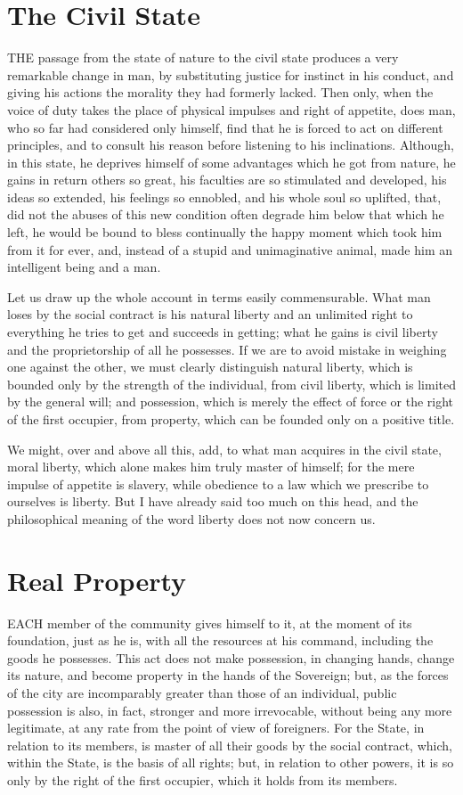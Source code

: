 \documentclass[12pt]{book}
\begin{document}
\section{The Civil State}
THE passage from the state of nature to the civil state produces a very remarkable change in man, by substituting justice for instinct in his conduct, and giving his actions the morality they had formerly lacked. Then only, when the voice of duty takes the place of physical impulses and right of appetite, does man, who so far had considered only himself, find that he is forced to act on different principles, and to consult his reason before listening to his inclinations. Although, in this state, he deprives himself of some advantages which he got from nature, he gains in return others so great, his faculties are so stimulated and developed, his ideas so extended, his feelings so ennobled, and his whole soul so uplifted, that, did not the abuses of this new condition often degrade him below that which he left, he would be bound to bless continually the happy moment which took him from it for ever, and, instead of a stupid and unimaginative animal, made him an intelligent being and a man.

Let us draw up the whole account in terms easily commensurable. What man loses by the social contract is his natural liberty and an unlimited right to everything he tries to get and succeeds in getting; what he gains is civil liberty and the proprietorship of all he possesses. If we are to avoid mistake in weighing one against the other, we must clearly distinguish natural liberty, which is bounded only by the strength of the individual, from civil liberty, which is limited by the general will; and possession, which is merely the effect of force or the right of the first occupier, from property, which can be founded only on a positive title.

We might, over and above all this, add, to what man acquires in the civil state, moral liberty, which alone makes him truly master of himself; for the mere impulse of appetite is slavery, while obedience to a law which we prescribe to ourselves is liberty. But I have already said too much on this head, and the philosophical meaning of the word liberty does not now concern us.
\clearpage
\section{Real Property}
EACH member of the community gives himself to it, at the moment of its foundation, just as he is, with all the resources at his command, including the goods he possesses. This act does not make possession, in changing hands, change its nature, and become property in the hands of the Sovereign; but, as the forces of the city are incomparably greater than those of an individual, public possession is also, in fact, stronger and more irrevocable, without being any more legitimate, at any rate from the point of view of foreigners. For the State, in relation to its members, is master of all their goods by the social contract, which, within the State, is the basis of all rights; but, in relation to other powers, it is so only by the right of the first occupier, which it holds from its members.
\end{document}

